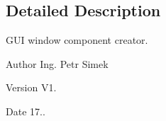 \subsection{Detailed Description}
G\+UI window component creator. 

\begin{DoxyAuthor}{Author}
Ing. Petr Simek 
\end{DoxyAuthor}
\begin{DoxyVersion}{Version}
V1. 
\end{DoxyVersion}
\begin{DoxyDate}{Date}
17.. 
\end{DoxyDate}
